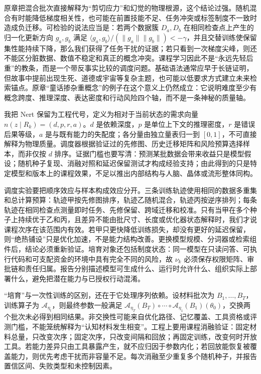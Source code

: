 原章把混合批次直接解释为“剪切应力”和幻觉的物理根源，这个结论过强。随机混合有时能降低梯度相关性，也可能在前置技能不足、任务冲突或标签制度不一致时造成负迁移。可检验的说法应当是：若两个数据簇 $D_a,D_b$ 在相同检查点上产生的归一化更新方向 $g_a,g_b$ 满足 $\langle g_a,g_b\rangle/(\|g_a\|\|g_b\|)<-\gamma$，并且交替训练使保留集性能持续下降，那么我们获得了任务干扰的证据；若只看到一次梯度尖峰，则还不能区分脏数据、数值不稳定和真正的概念冲突。课程学习因此不是“永远先轻后重”的教条，而是一个带反事实比较的调度问题。基础语法通常应早于长链证明，但故事中提前出现生死、道德或宇宙等复杂主题，也可能以低要求方式建立未来检索锚点。原章“童话掺杂重概念”的例子在这个意义上仍然成立：它说明难度至少有概念跨度、推理深度、表达密度和行动风险四个轴，而不是一条神秘的质量轴。

我把 Nert 保留为工程代号，定义为相对于当前状态的需求向量 $n(z\mid R_k)=(d,p,r,a)$。$d$ 是依赖深度，$p$ 是单位上下文的推理密度，$r$ 是错误后果等级，$a$ 是与既有能力的失配度；各分量由独立量表归一到 $[0,1]$，不可直接解释为物理质量。调度器根据验证过的先修图、历史迁移矩阵和风险预算选择样本，而非仅按 $d$ 排序。证据门槛也要写清：预测某批数据会带来收益只是模型假设；随机种子复现、消融对照和延迟保留测试才构成经验支持；由此得到的只是特定模型和版本上的课程效果，不足以推出内部结构与人脑、晶体或流形整体同构。

调度实验要把顺序效应与样本构成效应分开。三条训练轨迹使用相同的数据多重集和总计算预算：轨迹甲按先修图排序，轨迹乙随机混合，轨迹丙按逆序排列；每条轨迹在相同检查点测量即时任务、先修保留、跨域迁移和校准。只有当甲在多个种子上持续优于乙和丙，且差异不能由批尺寸、长度或优化器状态解释时，我们才说课程次序在该范围内有效。若甲只更快降低训练损失，却没有更好的延迟保留，则“绝热铺设”只是优化加速，不是能力结构改善。更换模型规模、分词器或检索组件后，结论必须重新验证。培育对象还包括制度状态：同一模型在只读问答、可执行代码和可支配资金的环境中具有完全不同的风险，故 $\nu_k$ 必须保存权限矩阵、审批链和责任归属。报告分别描述模型可生成什么、运行时允许什么、组织实际上部署什么，避免把潜在能力与已授权行动混淆。

“培育”与一次性训练的区别，还在于它处理序列依赖。设材料批次为 $B_1,\ldots,B_T$，训练算子为 $\mathcal A_{\eta_t}$，则最终参数一般满足 $\mathcal A_{\eta_T}(B_T)\circ\cdots\circ\mathcal A_{\eta_1}(B_1)(\theta_0)$，交换两个批次未必得到相同结果。非交换性可能来自优化路径、记忆覆盖、工具资格或评测门槛，不能笼统解释为“认知材料发生相变”。工程上要用课程消融验证：固定材料总量，只改变次序；固定次序，只改变间隔和回放；再固定训练，改变何时开放工具。若能力差异只由工具暴露产生，就不应归因于参数内化；若回放能恢复被覆盖能力，则优先考虑干扰而非容量不足。每次消融至少重复多个随机种子，并报告置信区间、失败类型和未控制因素。


